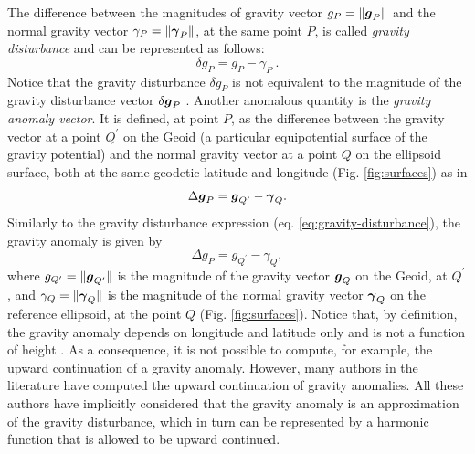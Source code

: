 \documentclass[extra]{gji}
\begin{document}
The difference between the magnitudes of gravity vector
$g_{P} = \| \mitbf{g}_{P} \|$ and the normal gravity vector
$\gamma_{P} = \| \mitbf{\gamma}_{P} \|$, at the 
same point $P$, is called \textit{gravity disturbance} 
\citep{heiskanen-moritz1967, hofmann-wellenhof-moritz2005} 
and can be represented as follows:
\begin{equation}
\delta g_{P} = g_{P} - \gamma_{P} \: .
\label{eq:gravity-disturbance}
\end{equation}
Notice that the gravity disturbance $\delta g_{P}$ is not equivalent 
to the magnitude of the gravity disturbance vector 
$\delta \mitbf{g}_{P}$ \citep{barthelmes2013, sanso_sideris2013}.
Another anomalous quantity is the \textit{gravity anomaly vector}.
It is defined, at point $P$, as the difference between the gravity
vector at a point $Q^{\prime}$ on the Geoid (a particular
equipotential surface of the gravity potential) and the normal
gravity vector at a point $Q$ on the ellipsoid surface, both at the
same geodetic latitude and longitude (Fig. \ref{fig:surfaces}) as in
\begin{equation}
\Delta \mitbf{g}_{P} = \mitbf{g}_{Q^{\prime}} - \mitbf{\gamma}_{Q} .
\label{eq:gravity-anomaly-vector}
\end{equation}
Similarly to the gravity disturbance expression (eq.
\ref{eq:gravity-disturbance}), the gravity anomaly is given by
\begin{equation}
\Delta g_{P} = g_{Q^{\prime}} - \gamma_{Q} ,
\label{eq:gravity-anomaly}
\end{equation}
where $g_{Q^{\prime} } = \| \mitbf{g}_{Q^{\prime}} \|$ is
the magnitude of the gravity vector $\mitbf{g}_{Q}$ on the Geoid,
at $Q^{\prime}$, and $\gamma_{Q} = \| \mitbf{\gamma}_{Q} \|$ is the 
magnitude of the normal gravity vector $\mitbf{\gamma}_{Q}$ 
on the reference ellipsoid, at the point $Q$ (Fig. \ref{fig:surfaces}).
Notice that, by definition, the gravity anomaly depends on 
longitude and latitude only and is not a function of height 
\citep{barthelmes2013}. As a consequence, it is not possible to compute,
for example, the upward continuation of a gravity anomaly.
However, many authors in the literature have computed the upward 
continuation of gravity anomalies. All these authors have
implicitly considered that the gravity anomaly is an approximation of 
the gravity disturbance, which in turn can be represented by a 
harmonic function that is allowed to be upward continued.
\end{document}
